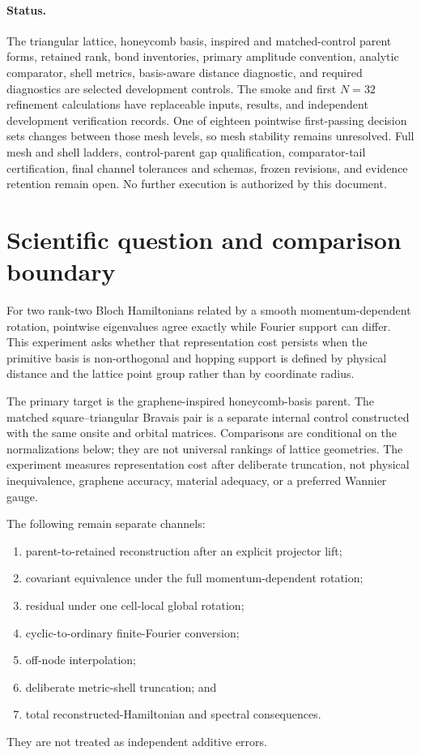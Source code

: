 \documentclass[11pt]{article}
\begin{document}
\paragraph{Status.}
The triangular lattice, honeycomb basis, inspired and matched-control parent forms,
retained rank, bond inventories, primary amplitude convention, analytic comparator,
shell metrics, basis-aware distance diagnostic, and required diagnostics are selected
development controls.  The smoke and first $N=32$ refinement calculations have
replaceable inputs, results, and independent development verification records.  One of
eighteen pointwise first-passing decision sets changes between those mesh levels, so
mesh stability remains unresolved.  Full mesh and shell ladders, control-parent gap
qualification, comparator-tail certification, final channel
tolerances and schemas, frozen revisions, and evidence retention remain open.  No
further execution is authorized by this document.

\section{Scientific question and comparison boundary}

For two rank-two Bloch Hamiltonians related by a smooth momentum-dependent rotation,
pointwise eigenvalues agree exactly while Fourier support can differ.  This experiment
asks whether that representation cost persists when the primitive basis is
non-orthogonal and hopping support is defined by physical distance and the lattice point
group rather than by coordinate radius.

The primary target is the graphene-inspired honeycomb-basis parent.  The matched
square--triangular Bravais pair is a separate internal control constructed with the same
onsite and orbital matrices.  Comparisons are conditional on the normalizations below;
they are not universal rankings of lattice geometries.  The experiment measures
representation cost after deliberate truncation, not physical inequivalence, graphene
accuracy, material adequacy, or a preferred Wannier gauge.

The following remain separate channels:
\begin{enumerate}[label=\arabic*.]
 \item parent-to-retained reconstruction after an explicit projector lift;
 \item covariant equivalence under the full momentum-dependent rotation;
 \item residual under one cell-local global rotation;
 \item cyclic-to-ordinary finite-Fourier conversion;
 \item off-node interpolation;
 \item deliberate metric-shell truncation; and
 \item total reconstructed-Hamiltonian and spectral consequences.
\end{enumerate}
They are not treated as independent additive errors.
\end{document}
